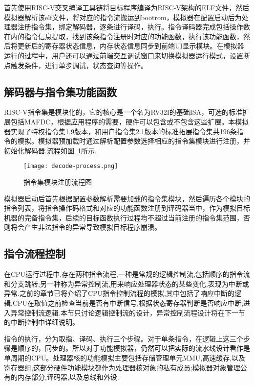 首先使用RISC-V交叉编译工具链将目标程序编译为RISC-V架构的ELF文件，然后模拟器解析该elf文件，将对应的指令流搬运到bootrom，模拟器在配置启动后为处理器注册指令集，绑定解码器，逐条进行译码，执行。指令译码器完成包括操作数在内的指令信息提取，找到该条指令注册时对应的功能函数，执行该功能函数，然后将更新后的寄存器状态信息，内存状态信息同步到前端UI显示模块。在模拟器运行的过程中，用户还可以通过前端交互调试窗口来切换模拟器运行模式，设置断点触发条件，进行单步调试，状态查询等操作。

\subsection{解码器与指令集功能函数}
RISC-V指令集是模块化的，它的核心是一个名为RV32I的基础ISA，可选的标准扩展包括MAFDC，根据应用程序的需要，硬件可以包含或不包含这些扩展。本模拟器实现了特权指令集1.9版本，和用户指令集2.1版本的标准拓展指令集共196条指令的模拟。模拟器预加载时通过解析配置参数选择相应的指令集模块进行注册，并初始化解码器.流程如图~\ref{fig:decode-process}所示.
\begin{figure}[H]
  \centering
  \texttt{[image: decode-process.png]}
  \caption{指令集模块注册流程图}
  \label{fig:decode-process}
\end{figure}


模拟器启动后首先根据配置参数解析需要加载的指令集模块，然后遍历各个模块的指令列表，将指令操作码格式和对应的功能函数注册到译码器当中，作为模拟目标机器的完备指令集，后续的目标函数执行过程均不超过当前注册的指令集范围，否则将会产生非法指令的异常导致模拟目标程序崩溃。

\subsection{指令流程控制}
在CPU运行过程中,存在两种指令流程,一种是常规的逻辑控制流,包括顺序的指令流和分支跳转;另一种称为异常控制流,用来响应处理器状态的某些变化,表现为中断或异常.之前的章节已将介绍了CPU指令控制流程的模拟,其中包括了响应中断的逻辑,CPU在取值之前检查当前是否有中断信号,根据状态寄存器判断是否响应中断,进入异常控制流逻辑.本节只讨论逻辑控制流的设计，异常控制流程设计将在下一节的中断控制中详细说明。


指令的执行，分为取指、译码、执行三个步骤。对于单条指令，在逻辑上这三个步骤是顺序的，同步的。所以对于功能模拟器，仍然可以把实际的流水线设计看作是单周期的CPU。处理器核的功能模拟主要包括存储管理单元MMU,高速缓存,以及寄存器组,这部分硬件功能模块都作为处理器核对象的私有成员;模拟器对象管理公有的内存部分,译码器,以及总线和外设.


